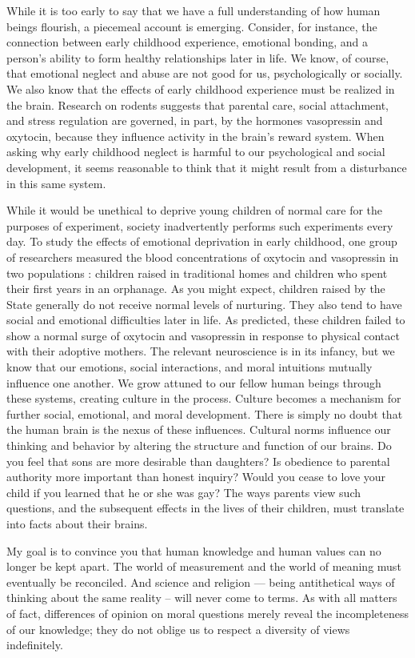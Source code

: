 \documentclass[a4paper,14pt]{extarticle}
\begin{document}
While it is too early to say that we have a full understanding of how human beings flourish, a piecemeal account is emerging.
Consider, for instance, the connection between early childhood experience, emotional bonding, and a person's ability to form healthy relationships later in life.
We know, of course, that emotional neglect and abuse are not good for us, psychologically or socially.
We also know that the effects of early childhood experience must be realized in the brain.
Research on rodents suggests that parental care, social attachment, and stress regulation are governed, in part, by the hormones vasopressin and oxytocin, because they influence activity in the brain's reward system.
When asking why early childhood neglect is harmful to our psychological and social development, it seems reasonable to think that it might result from a disturbance in this same system.

While it would be unethical to deprive young children of normal care for the purposes of experiment, society inadvertently performs such experiments every day.
To study the effects of emotional deprivation in early childhood, one group of researchers measured the blood concentrations of oxytocin and vasopressin in two populations :
children raised in traditional homes and children who spent their first years in an orphanage.
As you might expect, children raised by the State generally do not receive normal levels of nurturing.
They also tend to have social and emotional difficulties later in life.
As predicted, these children failed to show a normal surge of oxytocin and vasopressin in response to physical contact with their adoptive mothers.
The relevant neuroscience is in its infancy, but we know that our emotions, social interactions, and moral intuitions mutually influence one another.
We grow attuned to our fellow human beings through these systems, creating culture in the process.
Culture becomes a mechanism for further social, emotional, and moral development.
There is simply no doubt that the human brain is the nexus of these influences.
Cultural norms influence our thinking and behavior by altering the structure and function of our brains.
Do you feel that sons are more desirable than daughters?
Is obedience to parental authority more important than honest inquiry?
Would you cease to love your child if you learned that he or she was gay?
The ways parents view such questions, and the subsequent effects in the lives of their children, must translate into facts about their brains.

My goal is to convince you that human knowledge and human values can no longer be kept apart.
The world of measurement and the world of meaning must eventually be reconciled.
And science and religion --- being antithetical ways of thinking about the same reality -- will never come to terms.
As with all matters of fact, differences of opinion on moral questions merely reveal the incompleteness of our knowledge;
they do not oblige us to respect a diversity of views indefinitely.
\end{document}
